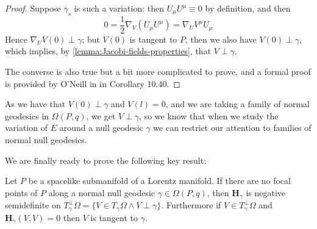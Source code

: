 \begin{proof}
	Suppose \(\gamma_s\) is such a variation: then \(U_{\mu}U^{\mu}\equiv 0\) by definition, and then
	\[
	0 = \frac{1}{2}\nabla_V(U_{\mu}U^{\mu}) = \nabla_UV^{\mu}U_{\mu}
	\]
	Hence \(\nabla_UV(0) \perp \gamma\); but \(V(0)\) is tangent to \(P\), then we also have \(V(0) \perp \gamma\), which implies, by \ref{lemma:Jacobi-fields-properties}, that \(V \perp \gamma\).
	
	The converse is also true but a bit more complicated to prove, and a formal proof is provided by O'Neill in \cite{o1983semi} in Corollary 10.40.
\end{proof}

As we have that \(V(0) \perp \gamma\) and \(V(l) = 0\), and we are taking a family of normal geodesics in \(\Omega(P, q)\), we get \(V \perp \gamma\), so we know that when we study the variation of \(E\) around a null geodesic \(\gamma\) we can restrict our attention to families of normal null geodesics.

We are finally ready to prove the following key result:
\begin{prop}
	\label{prop:H-positivity-criteria}
	Let \(P\) be a spacelike submanifold of a Lorentz manifold. If there are no focal points of \(P\) along a normal null geodesic \(\gamma\in\Omega(P,q)\), then \(\textbf{H}_\gamma\) is negative semidefinite on 
	\(T_{\gamma}^{\perp}\Omega = \{V \in T_{\gamma}\Omega \wedge V \perp \gamma\}\). Furthermore if \(V \in T_{\gamma}^{\perp}\Omega \) and \(\textbf{H}_\gamma(V, V) = 0\) then \(V\) is tangent to \(\gamma\).
\end{prop}

